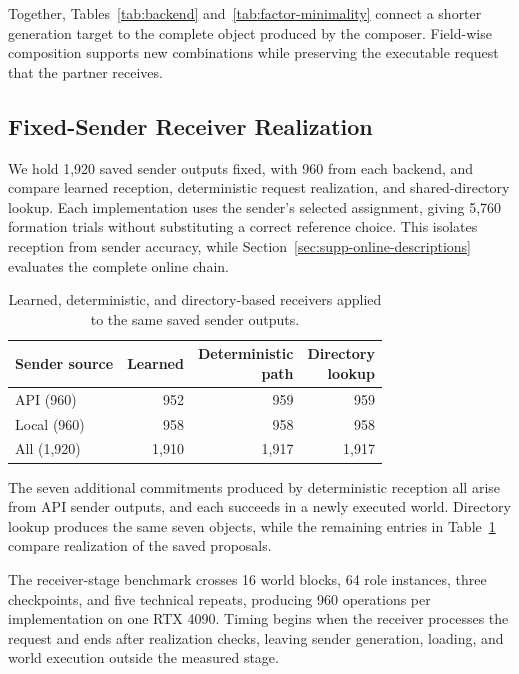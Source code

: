 \documentclass[sigconf,nonacm,balance=false]{aamas}
\newcommand{\tabstyle}{\small\setlength{\tabcolsep}{3pt}\renewcommand{\arraystretch}{1.10}}
\begin{document}
Together, Tables~\ref{tab:backend} and~\ref{tab:factor-minimality} connect a shorter generation target to the complete object produced by the composer. Field-wise composition supports new combinations while preserving the executable request that the partner receives.

\subsection{Fixed-Sender Receiver Realization}
\label{sec:supp-receiver}

We hold 1,920 saved sender outputs fixed, with 960 from each backend, and compare learned reception, deterministic request realization, and shared-directory lookup. Each implementation uses the sender's selected assignment, giving 5,760 formation trials without substituting a correct reference choice. This isolates reception from sender accuracy, while Section~\ref{sec:supp-online-descriptions} evaluates the complete online chain.

\begin{table}[!htbp]
\centering\tabstyle
\caption{Learned, deterministic, and directory-based receivers applied to the same saved sender outputs.}
\label{tab:receiver-formation}
\begin{tabular}{@{}lrrr@{}}
\toprule
Sender source & Learned & \shortstack{Deterministic\\path} & \shortstack{Directory\\lookup}\\
\midrule
API (960) & 952 & 959 & 959\\
Local (960) & 958 & 958 & 958\\
All (1,920) & 1,910 & 1,917 & 1,917\\
\bottomrule
\end{tabular}
\end{table}

The seven additional commitments produced by deterministic reception all arise from API sender outputs, and each succeeds in a newly executed world. Directory lookup produces the same seven objects, while the remaining entries in Table~\ref{tab:receiver-formation} compare realization of the saved proposals.

The receiver-stage benchmark crosses 16 world blocks, 64 role instances, three checkpoints, and five technical repeats, producing 960 operations per implementation on one RTX 4090. Timing begins when the receiver processes the request and ends after realization checks, leaving sender generation, loading, and world execution outside the measured stage.
\end{document}
